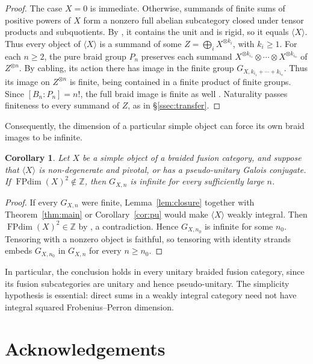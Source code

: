 \documentclass[11pt,oneside]{amsart}
\newtheorem{corollary}[theorem]{Corollary}
\theoremstyle{remark}
\newcommand{\FP}{\operatorname{FPdim}}
\newcommand{\Z}{\mathbb Z}
\begin{document}
\begin{proof}
The case $X=0$ is immediate. Otherwise, summands of finite sums of positive
powers of $X$ form a nonzero full abelian subcategory closed under tensor
products and subquotients. By \cite[Corollary~4.11.4]{EGNO}, it contains the unit and
is rigid, so it equals $\langle X\rangle$. Thus every object of $\langle
X\rangle$ is a summand of some $Z=\bigoplus_iX^{\otimes k_i}$, with $k_i\ge1$.
For each $n\ge2$, the pure braid group $P_n$ preserves each summand
$X^{\otimes k_{i_1}}\otimes\cdots\otimes X^{\otimes k_{i_n}}$ of $Z^{\otimes n}$.
By cabling, its action there has image in the finite group
$G_{X,k_{i_1}+\cdots+k_{i_n}}$. Thus its image on $Z^{\otimes n}$ is finite,
being contained in a finite product of finite groups. Since $[B_n:P_n]=n!$, the
full braid image is finite as well \cite[Lemma~2.1]{ERW}. Naturality passes
finiteness to every summand of $Z$, as in \S\ref{ssec:transfer}.
\end{proof}

Consequently, the dimension of a particular simple object can force its own
braid images to be infinite.

\begin{corollary}\label{cor:object}
Let $X$ be a simple object of a braided fusion category, and suppose that
$\langle X\rangle$ is non-degenerate and pivotal, or has a pseudo-unitary
Galois conjugate. If $\FP(X)^2\notin\Z$, then $G_{X,n}$ is infinite for every
sufficiently large $n$.
\end{corollary}

\begin{proof}
If every $G_{X,n}$ were finite, Lemma~\ref{lem:closure} together with
Theorem~\ref{thm:main} or Corollary~\ref{cor:pu} would make $\langle X\rangle$
weakly integral. Then $\FP(X)^2\in\Z$ by \cite[Proposition~8.27]{ENO}, a
contradiction. Hence $G_{X,n_0}$ is infinite for some $n_0$. Tensoring with a
nonzero object is faithful, so tensoring with identity strands embeds
$G_{X,n_0}$ in $G_{X,n}$ for every $n\ge n_0$.
\end{proof}

In particular, the conclusion holds in every unitary braided fusion category,
since its fusion subcategories are unitary and hence pseudo-unitary. The
simplicity hypothesis is essential: direct sums in a weakly integral category
need not have integral squared Frobenius--Perron dimension.

\section*{Acknowledgements}
\end{document}
